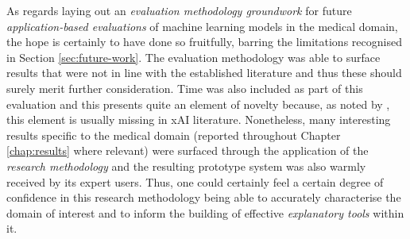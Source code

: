 As regards laying out an \textit{evaluation methodology groundwork} for future \textit{application-based evaluations} of machine learning models in the medical domain, the hope is certainly to have done so fruitfully, barring the limitations recognised in Section \ref{sec:future-work}.
The evaluation methodology was able to surface results that were not in line with the established literature and thus these should surely merit further consideration.
Time was also included as part of this evaluation and this presents quite an element of novelty because, as noted by \citet{gilpin2018explaining}, this element is usually missing in xAI literature.
Nonetheless, many interesting results specific to the medical domain (reported throughout Chapter \ref{chap:results} where relevant) were surfaced through the application of the \textit{research methodology} and the resulting prototype system was also warmly received by its expert users.
Thus, one could certainly feel a certain degree of confidence in this research methodology being able to accurately characterise the domain of interest and to inform the building of effective \textit{explanatory tools} within it.